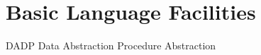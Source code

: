 \part{Basic Language Facilities}

\begin{flushright}
{DADP}
\linebreak
{Data Abstraction}
\linebreak
{Procedure Abstraction}
\end{flushright}


